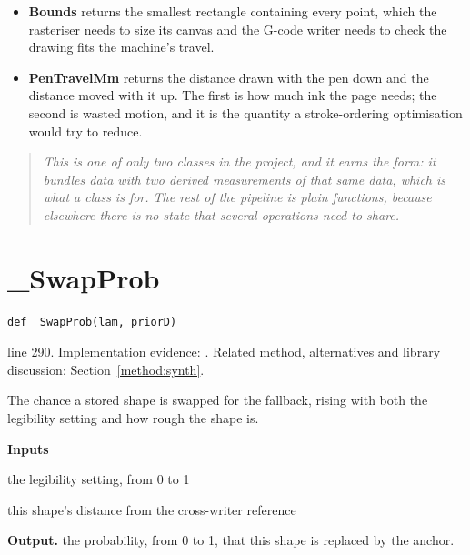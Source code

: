 
\begin{itemize}\setlength\itemsep{0pt}
  \item \textbf{Bounds} returns the smallest rectangle containing every point, which the rasteriser needs to size its canvas and the G-code writer needs to check the drawing fits the machine's travel.
  \item \textbf{PenTravelMm} returns the distance drawn with the pen down and the distance moved with it up. The first is how much ink the page needs; the second is wasted motion, and it is the quantity a stroke-ordering optimisation would try to reduce.
\end{itemize}

\begin{quote}\small\itshape This is one of only two classes in the project, and it earns the form: it bundles data with two derived measurements of that same data, which is what a class is for. The rest of the pipeline is plain functions, because elsewhere there is no state that several operations need to share.\end{quote}


\section{\_SwapProb}\label{fn:synthesise:-SwapProb}
\begin{lstlisting}[style=sig]
def _SwapProb(lam, priorD)
\end{lstlisting}
 line 290. Implementation evidence: \cite{code2026}. Related method, alternatives and library discussion: Section~\ref{method:synth}.


The chance a stored shape is swapped for the fallback, rising with both the legibility setting and how rough the shape is.




\noindent\textbf{Inputs}
\begin{description}[leftmargin=2.2em,style=nextline,font=\normalfont\ttfamily]\setlength\itemsep{1pt}
  \item[{lam}] \normalfont the legibility setting, from 0 to 1
  \item[{priorD}] \normalfont this shape's distance from the cross-writer reference
\end{description}

\noindent\textbf{Output.} the probability, from 0 to 1, that this shape is replaced by the anchor.



